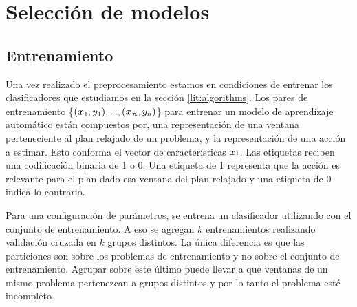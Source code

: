 \begin{table}[h!]
\centering
{}
 \caption{Ejemplos etiquetados a partir de un plan relajado y una acción}
 \label{tb:matrix_shape}
\end{table}

\section{Selección de modelos}
\label{method:model_selection}

\subsection{Entrenamiento}

Una vez realizado el preprocesamiento estamos en condiciones de entrenar los
clasificadores que estudiamos en la sección \ref{lit:algorithms}. Los pares de
entrenamiento \{$(\boldsymbol{x}_1, y_1), ..., (\boldsymbol{x_n}, y_n)$\} para entrenar un
modelo de aprendizaje automático están compuestos por, una representación de una
ventana perteneciente al plan relajado de un problema, y la representación de
una acción a estimar. Esto conforma el vector de características $\boldsymbol{x}_i$.
Las etiquetas reciben una codificación binaria de 1 o 0. Una etiqueta de 1
representa que la acción es relevante para el plan dado esa ventana del plan
relajado y una etiqueta de 0 indica lo contrario.

Para una configuración de parámetros, se entrena un clasificador utilizando con
el conjunto de entrenamiento. A eso se agregan $k$ entrenamientos realizando
validación cruzada en $k$ grupos distintos. La única diferencia es que las
particiones son sobre los problemas de entrenamiento y no sobre el conjunto de
entrenamiento. Agrupar sobre este último puede llevar a que ventanas de un mismo
problema pertenezcan a grupos distintos y por lo tanto el problema esté
incompleto.

